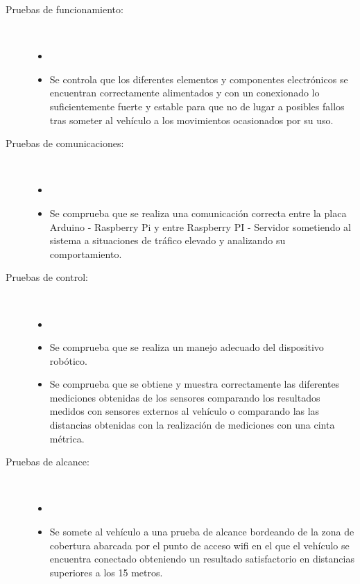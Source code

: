 \begin{description} 

\item [Pruebas de funcionamiento:]\\

\begin{itemize}
    \item[]
 \item Se controla que los diferentes elementos y componentes electrónicos se encuentran correctamente alimentados y con un conexionado lo suficientemente fuerte y estable 
 para que no de lugar a posibles fallos tras someter al vehículo a los movimientos ocasionados por su uso.
\end{itemize}


\item [Pruebas de comunicaciones:]\\

\begin{itemize}
    \item[]
 \item Se comprueba que se realiza una comunicación correcta entre la placa Arduino - Raspberry Pi y entre Raspberry PI - Servidor sometiendo al sistema a situaciones de tráfico elevado
 y analizando su comportamiento.
\end{itemize}


\item [Pruebas de control:] \\

\begin{itemize}
    \item[]
 \item Se comprueba que se realiza un manejo adecuado del dispositivo robótico.
 \item Se comprueba que se obtiene y muestra correctamente las diferentes mediciones obtenidas de los sensores comparando los resultados medidos con sensores externos al vehículo o comparando
 las las distancias obtenidas con la realización de mediciones con una cinta métrica. 
\end{itemize}


\item [ Pruebas de alcance:] \\ 

\begin{itemize}
    \item[]
 \item Se somete al vehículo a una prueba de alcance bordeando de la zona de cobertura abarcada por el punto de acceso wifi en el que el vehículo se encuentra conectado obteniendo un
 resultado satisfactorio en distancias superiores a los 15 metros.
\end{itemize}


\end{description}
